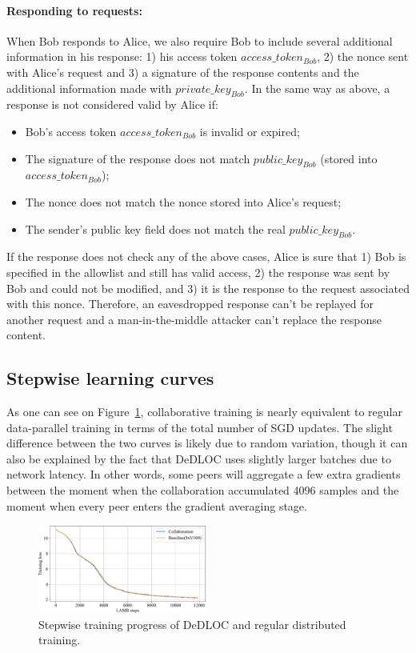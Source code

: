 \paragraph{Responding to requests:} When Bob responds to Alice, we also require Bob to include several additional information in his response: 1) his access token $access\_token_{Bob}$, 2) the nonce sent with Alice's request and 3) a signature  of the response contents and the additional information made with $private\_key_{Bob}$. In the same way as above, a response is not considered valid by Alice if:
\begin{itemize}[leftmargin=*]
    \item Bob's access token $access\_token_{Bob}$ is invalid or expired;
    \item The signature of the response does not match $public\_key_{Bob}$ (stored into $access\_token_{Bob}$);
    \item The nonce does not match the nonce stored into Alice's request;
    \item The sender's public key field does not match the real $public\_key_{Bob}$.
\end{itemize}
If the response does not check any of the above cases, Alice is sure that 1) Bob is specified in the allowlist and still has valid access, 2) the response was sent by Bob and could not be modified, and 3) it is the response to the request associated with this nonce. Therefore, an eavesdropped response can't be replayed for another request and a man-in-the-middle attacker can't replace the response content.

\vspace{-4pt}
\subsection{Stepwise learning curves}\label{appendix:stepwise_learning_curves}
As one can see on Figure~\ref{fig:stepwise_learning_curves}, collaborative training is nearly equivalent to regular data-parallel training in terms of the total number of SGD updates. The slight difference between the two curves is likely due to random variation, though it can also be explained by the fact that DeDLOC uses slightly larger batches due to network latency. In other words, some peers will aggregate a few extra gradients between the moment when the collaboration accumulated 4096 samples and the moment when every peer enters the gradient averaging stage.

\vspace{-4pt}
\begin{figure}[h]
    \centering
    \includegraphics[height=110px]{resources/stepwise_bengali.pdf}
    \caption{Stepwise training progress of DeDLOC and regular distributed training.}
    \label{fig:stepwise_learning_curves}
    \vspace{-12pt}
\end{figure}



